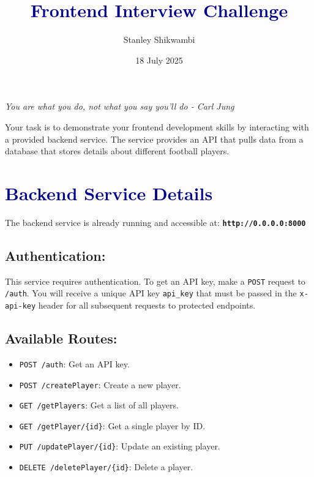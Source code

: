 \documentclass[10pt, a4paper]{article}
\title{\textcolor{darkblue}{\textbf{Frontend Interview Challenge}}}
\author{Stanley Shikwambi} %
\date{18 July 2025} %
\begin{document}
\maketitle
\thispagestyle{empty} %

\begin{center}
    \textit{You are what you do, not what you say you'll do - Carl Jung}
\end{center}

\vspace{1cm}

Your task is to demonstrate your frontend development skills by interacting with a provided backend service. The service provides an API that pulls data from a database that stores details about different football players.

\section*{\textcolor{darkblue}{Backend Service Details}}
The backend service is already running and accessible at:
\textbf{\texttt{http://0.0.0.0:8000}}

\subsection*{Authentication:}
This service requires authentication. To get an API key, make a \texttt{POST} request to \texttt{/auth}. You will receive a unique API key \texttt{api\_key} that must be passed in the \texttt{x-api-key} header for all subsequent requests to protected endpoints.

\subsection*{Available Routes:}
\begin{itemize}[label=\textbullet, leftmargin=*, itemsep=0.5em]
    \item \texttt{POST /auth}: Get an API key.
    \item \texttt{POST /createPlayer}: Create a new player.
    \item \texttt{GET /getPlayers}: Get a list of all players.
    \item \texttt{GET /getPlayer/\{id\}}: Get a single player by ID.
    \item \texttt{PUT /updatePlayer/\{id\}}: Update an existing player.
    \item \texttt{DELETE /deletePlayer/\{id\}}: Delete a player.
\end{itemize}
\end{document}
